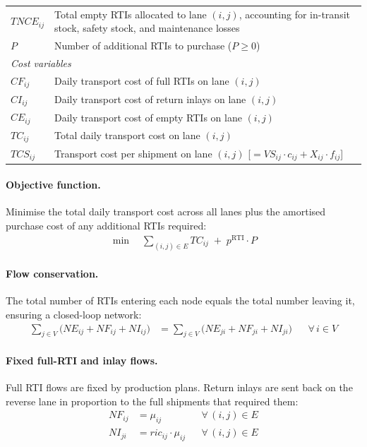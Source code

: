 \begin{longtable}{|p{}|p{}|}
$TNCE_{ij}$  & Total empty RTIs allocated to lane $(i,j)$, accounting for
               in-transit stock, safety stock, and maintenance losses \\
$P$          & Number of additional RTIs to purchase ($P \geq 0$) \\
\hline
\multicolumn{2}{|l|}{\textit{Cost variables}}\\ \hline
$CF_{ij}$    & Daily transport cost of full RTIs on lane $(i,j)$ \\
$CI_{ij}$    & Daily transport cost of return inlays on lane $(i,j)$ \\
$CE_{ij}$    & Daily transport cost of empty RTIs on lane $(i,j)$ \\
$TC_{ij}$    & Total daily transport cost on lane $(i,j)$ \\
$TCS_{ij}$   & Transport cost per shipment on lane $(i,j)$
               [$= VS_{ij}\cdot c_{ij} + X_{ij}\cdot f_{ij}$] \\
\hline
\end{longtable}

\paragraph{Objective function.}
Minimise the total daily transport cost across all lanes plus the amortised
purchase cost of any additional RTIs required:
%
\begin{align}
  \min \quad \sum_{(i,j)\in E} TC_{ij} \;+\; p^{\text{RTI}} \cdot P
  \label{eq:objective}
\end{align}

\paragraph{Flow conservation.}
The total number of RTIs entering each node equals the total number leaving it,
ensuring a closed-loop network:
%
\begin{align}
  \sum_{j \in V}\!\bigl(NE_{ij}+NF_{ij}+NI_{ij}\bigr)
  &= \sum_{j \in V}\!\bigl(NE_{ji}+NF_{ji}+NI_{ji}\bigr)
  && \forall\, i \in V
  \label{eq:flow-conservation}
\end{align}

\paragraph{Fixed full-RTI and inlay flows.}
Full RTI flows are fixed by production plans. Return inlays are sent back on
the reverse lane in proportion to the full shipments that required them:
%
\begin{align}
  NF_{ij} &= \mu_{ij}
    && \forall\,(i,j)\in E
    \label{eq:full-fixed}\\
  NI_{ji} &= ric_{ij}\cdot\mu_{ij}
    && \forall\,(i,j)\in E
    \label{eq:inlay-fixed}
\end{align}

